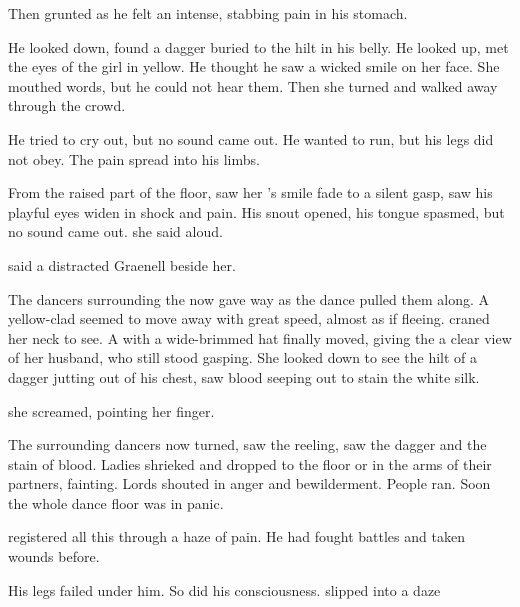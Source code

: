 \begin{garbage}

Then grunted as he felt an intense, stabbing pain in his stomach. 

He looked down, found a dagger buried to the hilt in his belly. He looked up, met the eyes of the girl in yellow. He thought he saw a wicked smile on her face. She mouthed words, but he could not hear them. Then she turned and walked away through the crowd. 

 He tried to cry out, but no sound came out. He wanted to run, but his legs did not obey. The pain spread into his limbs. 

From the raised part of the floor, \Tiroco{} saw her \rayuth's smile fade to a silent gasp, saw his playful eyes widen in shock and pain. His snout opened, his tongue spasmed, but no sound came out.  she said aloud. 

 said a distracted Graenell beside her. 

The dancers surrounding the \rayuth now gave way as the dance pulled them along. A yellow-clad \human{} seemed to move away with great speed, almost as if fleeing. \Tiroco{} craned her neck to see. A \sphyle{} with a wide-brimmed hat finally moved, giving the \rinyuth a clear view of her husband, who still stood gasping. She looked down to see the hilt of a dagger jutting out of his chest, saw blood seeping out to stain the white silk. 

 she screamed, pointing her finger. 

The surrounding dancers now turned, saw the \rayuth reeling, saw the dagger and the stain of blood. Ladies shrieked and dropped to the floor or in the arms of their partners, fainting. Lords shouted in anger and bewilderment. People ran. Soon the whole dance floor was in panic. 


\Icor{} registered all this through a haze of pain. 
He had fought battles and taken wounds before. 

His legs failed under him. So did his consciousness. \Icor{} slipped into a daze\prikker


\end{garbage}
